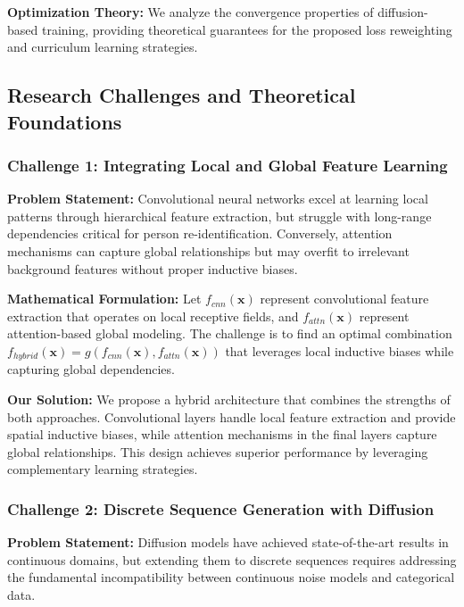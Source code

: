 \documentclass[a4paper,12pt]{article}
\begin{document}
\textbf{Optimization Theory:} We analyze the convergence properties of diffusion-based training, providing theoretical guarantees for the proposed loss reweighting and curriculum learning strategies.

\subsection{Research Challenges and Theoretical Foundations}

\subsubsection{Challenge 1: Integrating Local and Global Feature Learning}

\textbf{Problem Statement:} Convolutional neural networks excel at learning local patterns through hierarchical feature extraction, but struggle with long-range dependencies critical for person re-identification. Conversely, attention mechanisms can capture global relationships but may overfit to irrelevant background features without proper inductive biases.

\textbf{Mathematical Formulation:} Let $f_{cnn}(\mathbf{x})$ represent convolutional feature extraction that operates on local receptive fields, and $f_{attn}(\mathbf{x})$ represent attention-based global modeling. The challenge is to find an optimal combination $f_{hybrid}(\mathbf{x}) = g(f_{cnn}(\mathbf{x}), f_{attn}(\mathbf{x}))$ that leverages local inductive biases while capturing global dependencies.

\textbf{Our Solution:} We propose a hybrid architecture that combines the strengths of both approaches. Convolutional layers handle local feature extraction and provide spatial inductive biases, while attention mechanisms in the final layers capture global relationships. This design achieves superior performance by leveraging complementary learning strategies.

\subsubsection{Challenge 2: Discrete Sequence Generation with Diffusion}

\textbf{Problem Statement:} Diffusion models have achieved state-of-the-art results in continuous domains, but extending them to discrete sequences requires addressing the fundamental incompatibility between continuous noise models and categorical data.
\end{document}
